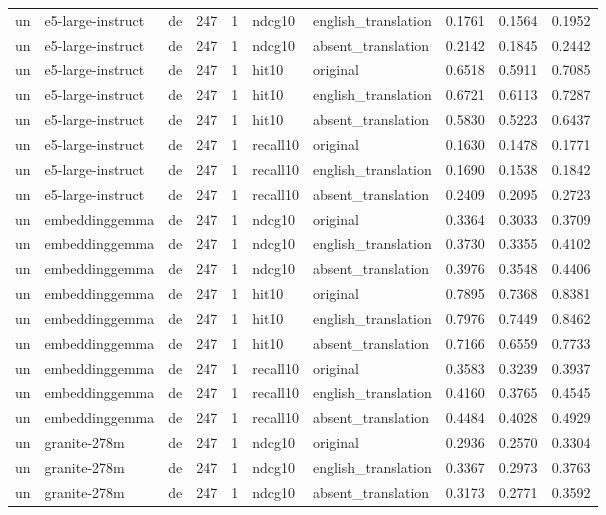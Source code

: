 \begin{tabular}{lllrrllrrr}
un & e5-large-instruct & de & 247 & 1 & ndcg10 & english\_translation & 0.1761 & 0.1564 & 0.1952 \\
un & e5-large-instruct & de & 247 & 1 & ndcg10 & absent\_translation & 0.2142 & 0.1845 & 0.2442 \\
un & e5-large-instruct & de & 247 & 1 & hit10 & original & 0.6518 & 0.5911 & 0.7085 \\
un & e5-large-instruct & de & 247 & 1 & hit10 & english\_translation & 0.6721 & 0.6113 & 0.7287 \\
un & e5-large-instruct & de & 247 & 1 & hit10 & absent\_translation & 0.5830 & 0.5223 & 0.6437 \\
un & e5-large-instruct & de & 247 & 1 & recall10 & original & 0.1630 & 0.1478 & 0.1771 \\
un & e5-large-instruct & de & 247 & 1 & recall10 & english\_translation & 0.1690 & 0.1538 & 0.1842 \\
un & e5-large-instruct & de & 247 & 1 & recall10 & absent\_translation & 0.2409 & 0.2095 & 0.2723 \\
un & embeddinggemma & de & 247 & 1 & ndcg10 & original & 0.3364 & 0.3033 & 0.3709 \\
un & embeddinggemma & de & 247 & 1 & ndcg10 & english\_translation & 0.3730 & 0.3355 & 0.4102 \\
un & embeddinggemma & de & 247 & 1 & ndcg10 & absent\_translation & 0.3976 & 0.3548 & 0.4406 \\
un & embeddinggemma & de & 247 & 1 & hit10 & original & 0.7895 & 0.7368 & 0.8381 \\
un & embeddinggemma & de & 247 & 1 & hit10 & english\_translation & 0.7976 & 0.7449 & 0.8462 \\
un & embeddinggemma & de & 247 & 1 & hit10 & absent\_translation & 0.7166 & 0.6559 & 0.7733 \\
un & embeddinggemma & de & 247 & 1 & recall10 & original & 0.3583 & 0.3239 & 0.3937 \\
un & embeddinggemma & de & 247 & 1 & recall10 & english\_translation & 0.4160 & 0.3765 & 0.4545 \\
un & embeddinggemma & de & 247 & 1 & recall10 & absent\_translation & 0.4484 & 0.4028 & 0.4929 \\
un & granite-278m & de & 247 & 1 & ndcg10 & original & 0.2936 & 0.2570 & 0.3304 \\
un & granite-278m & de & 247 & 1 & ndcg10 & english\_translation & 0.3367 & 0.2973 & 0.3763 \\
un & granite-278m & de & 247 & 1 & ndcg10 & absent\_translation & 0.3173 & 0.2771 & 0.3592 \\

\end{tabular}
